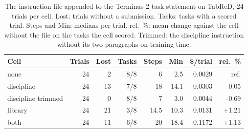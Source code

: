 \begin{table}[t]
\centering
\caption{The instruction file appended to the Terminus-2 task statement on TabReD, 24 trials per cell. Lost: trials without a submission. Tasks: tasks with a scored trial. Steps and Min: medians per trial. rel.\ \%: mean change against the cell without the file on the tasks the cell scored. Trimmed: the discipline instruction without its two paragraphs on training time.}
\label{tab:kdiscterm}
\footnotesize
\setlength{\tabcolsep}{2.2pt}
\begin{tabular}{lrrrrrrr}
\toprule
Cell & Trials & Lost & Tasks & Steps & Min & \$/trial & rel.\ \% \\
\midrule
none & 24 & 2 & 8/8 & 6 & 2.5 & 0.0029 & ref. \\
discipline & 24 & 13 & 7/8 & 18 & 14.1 & 0.0303 & -0.05 \\
discipline trimmed & 24 & 0 & 8/8 & 7 & 3.0 & 0.0044 & -0.69 \\
library & 24 & 21 & 3/8 & 14.5 & 10.3 & 0.0131 & +1.21 \\
both & 24 & 11 & 6/8 & 20 & 18.4 & 0.1172 & +1.13 \\
\bottomrule
\end{tabular}
\end{table}
